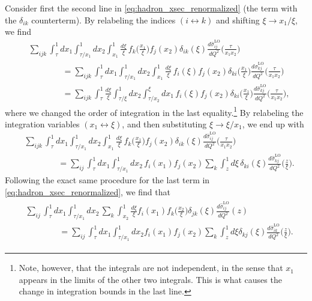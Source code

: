 Consider first the second line in \cref{eq:hadron_xsec_renormalized} (the term with the $\delta_{ik}$ counterterm).
By relabeling the indices $(i\leftrightarrow k)$ and shifting $\xi\to x_1/\xi$, we find
\begin{align}
    & \sum_{ijk} \int_\tau^1 dx_1 \int_{\tau/x_1}^1 dx_2 \int_{x_1}^1 \frac{d\xi}{\xi} \, f_k\biggl(\frac{x_1}{\xi}\biggr) f_j(x_2) \delta_{ik}(\xi) \frac{d\hat\sigma_{ij}^{\mathrm{LO}}}{dQ^2}\biggl(\frac{\tau}{x_1x_2}\biggr)
    \nonumber \\ &\hspace{4em}
    = \sum_{ijk} \int_\tau^1 dx_1 \int_{\tau/x_1}^1 dx_2 \int_{x_1}^1 \frac{d\xi}{\xi} \, f_i(\xi) f_j(x_2) \delta_{ki}\biggl(\frac{x_1}{\xi}\biggr) \frac{d\hat\sigma_{kj}^{\mathrm{LO}}}{dQ^2}\biggl(\frac{\tau}{x_1x_2}\biggr)
    \nonumber \\ &\hspace{4em}
    = \sum_{ijk} \int_\tau^1 \frac{d\xi}{\xi} \int_{\tau/\xi}^1 dx_2 \int_{\tau/x_2}^\xi dx_1 \, f_i(\xi) f_j(x_2) \delta_{ki}\biggl(\frac{x_1}{\xi}\biggr) \frac{d\hat\sigma_{kj}^{\mathrm{LO}}}{dQ^2}\biggl(\frac{\tau}{x_1x_2}\biggr),
\end{align}
where we changed the order of integration in the last equality.\footnote{Note, however, that the integrals are not independent, in the sense that $x_1$ appears in the limits of the other two integrals. This is what causes the change in integration bounds in the last line.}
By relabeling the integration variables $(x_1\leftrightarrow\xi)$, and then substituting $\xi\to\xi/x_1$, we end up with
\begin{align}
    & \sum_{ijk} \int_\tau^1 dx_1 \int_{\tau/x_1}^1 dx_2 \int_{x_1}^1 \frac{d\xi}{\xi} \, f_k\biggl(\frac{x_1}{\xi}\biggr) f_j(x_2) \delta_{ik}(\xi) \frac{d\hat\sigma_{ij}^{\mathrm{LO}}}{dQ^2}\biggl(\frac{\tau}{x_1x_2}\biggr)
    \nonumber \\ &\hspace{4em}
    = \sum_{ij} \int_\tau^1 dx_1 \int_{\tau/x_1}^1 dx_2 \, f_i(x_1) f_j(x_2) \sum_k \int_z^1 d\xi \, \delta_{ki}(\xi) \frac{d\hat\sigma_{kj}^{\mathrm{LO}}}{dQ^2}\biggl(\frac{z}{\xi}\biggr).
    \label{eq:hadron_xsec_renormalized_i}
\end{align}
Following the exact same procedure for the last term in \cref{eq:hadron_xsec_renormalized}, we find that
\begin{align}
\begin{split}
    &\sum_{ij} \int_\tau^1 dx_1 \int_{\tau/x_1}^1 dx_2 \, \sum_k\int_{x_2}^1\frac{d\xi}{\xi} f_i(x_1) f_k\biggl(\frac{x_2}{\xi}\biggr) \delta_{jk}(\xi) \frac{d\hat\sigma_{ij}^{\mathrm{LO}}}{dQ^2}(z)
    \\ &\hspace{4em}
    = \sum_{ij} \int_\tau^1 dx_1 \int_{\tau/x_1}^1 dx_2 f_i(x_1) f_j(x_2) \sum_k \int_z^1 d\xi \delta_{kj}(\xi) \frac{d\hat\sigma_{ik}^{\mathrm{LO}}}{dQ^2}\biggl(\frac{z}{\xi}\biggr).
\end{split}
\label{eq:hadron_xsec_renormalized_j}
\end{align}

